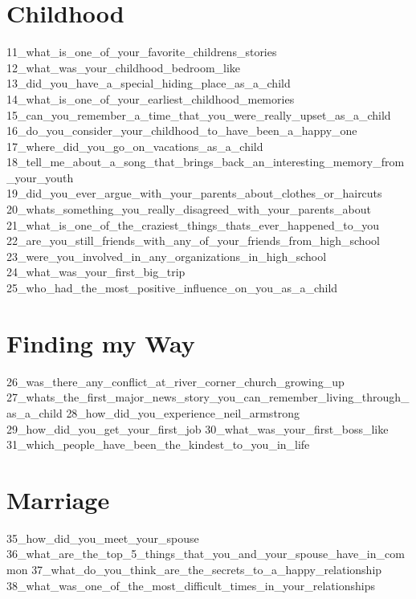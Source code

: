 \documentclass[smalldemyvopaper,11pt,twoside,onecolumn,openright,extrafontsizes]{memoir}
\begin{document}
\chapter{Childhood}
{11_what_is_one_of_your_favorite_childrens_stories}
{12_what_was_your_childhood_bedroom_like}
{13_did_you_have_a_special_hiding_place_as_a_child}
{14_what_is_one_of_your_earliest_childhood_memories}
{15_can_you_remember_a_time_that_you_were_really_upset_as_a_child}
{16_do_you_consider_your_childhood_to_have_been_a_happy_one}
{17_where_did_you_go_on_vacations_as_a_child}
{18_tell_me_about_a_song_that_brings_back_an_interesting_memory_from_your_youth}
{19_did_you_ever_argue_with_your_parents_about_clothes_or_haircuts}
{20_whats_something_you_really_disagreed_with_your_parents_about}
{21_what_is_one_of_the_craziest_things_thats_ever_happened_to_you}
{22_are_you_still_friends_with_any_of_your_friends_from_high_school}
{23_were_you_involved_in_any_organizations_in_high_school}
{24_what_was_your_first_big_trip}
{25_who_had_the_most_positive_influence_on_you_as_a_child}
\chapter{Finding my Way}
{26_was_there_any_conflict_at_river_corner_church_growing_up}
{27_whats_the_first_major_news_story_you_can_remember_living_through_as_a_child}
{28_how_did_you_experience_neil_armstrong}
{29_how_did_you_get_your_first_job}
{30_what_was_your_first_boss_like}
{31_which_people_have_been_the_kindest_to_you_in_life}
\chapter{Marriage}
{35_how_did_you_meet_your_spouse}
{36_what_are_the_top_5_things_that_you_and_your_spouse_have_in_common}
{37_what_do_you_think_are_the_secrets_to_a_happy_relationship}
{38_what_was_one_of_the_most_difficult_times_in_your_relationships}
\end{document}
